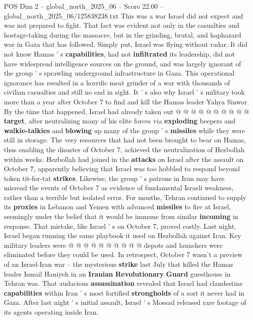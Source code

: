 \begin{textsample}{POS Dim 2 – global\_north\_2025\_06 – Score 22.00 – global\_north\_2025\_06/125838238.txt}
This was a war Israel did not expect and was not prepared to fight.
That fact was evident not only in the casualties and hostage-taking during the massacre, but in the grinding, brutal, and haphazard war in Gaza that has followed.
Simply put, Israel was flying without radar.
It did not know Hamas ' s \textbf{capabilities}, had not \textbf{infiltrated} its leadership, did not have widespread intelligence sources on the ground, and was largely ignorant of the group ' s sprawling underground infrastructure in Gaza.
This operational ignorance has resulted in a horrific meat grinder of a war with thousands of civilian casualties and still no end in sight.
It ' s also why Israel ' s military took more than a year after October 7 to find and kill the Hamas leader Yahya Sinwar.
By the time that happened, Israel had already taken out @ @ @ @ @ @ @ @ @ @ \textbf{target}, after neutralizing many of his elite forces via \textbf{exploding} beepers and \textbf{walkie-talkies} and \textbf{blowing} up many of the group ' s \textbf{missiles} while they were still in storage.
The very resources that had not been brought to bear on Hamas, thus enabling the disaster of October 7, achieved the neutralization of Hezbollah within weeks.
Hezbollah had joined in the \textbf{attacks} on Israel after the assault on October 7, apparently believing that Israel was too hobbled to respond beyond token tit-for-tat \textbf{strikes}.
Likewise, the group ' s patrons in Iran may have misread the events of October 7 as evidence of fundamental Israeli weakness, rather than a terrible but isolated error.
For months, Tehran continued to supply its \textbf{proxies} in Lebanon and Yemen with advanced \textbf{missiles} to fire at Israel, seemingly under the belief that it would be immune from similar \textbf{incoming} in response.
That mistake, like Israel ' s on October 7, proved costly.
Last night, Israel began running the same playbook it used on Hezbollah against Iran.
Key military leaders were @ @ @ @ @ @ @ @ @ @ depots and launchers were eliminated before they could be used.
In retrospect, October 7 wasn't a preview of an Israel-Iran war -- the mysterious \textbf{strike} last July that killed the Hamas leader Ismail Haniyeh in an \textbf{Iranian} \textbf{Revolutionary} \textbf{Guard} guesthouse in Tehran was.
That audacious \textbf{assassination} revealed that Israel had clandestine \textbf{capabilities} within Iran ' s most fortified \textbf{strongholds} of a sort it never had in Gaza.
After last night ' s initial assault, Israel ' s Mossad released rare footage of its agents operating inside Iran.

\end{textsample}
